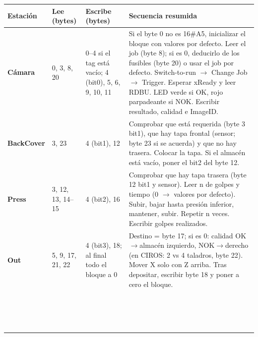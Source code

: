 \begin{tabularx}{\textwidth}{>{\bfseries}l p{2.6cm} p{3.6cm} X}
\toprule
Estación & Lee (bytes) & Escribe (bytes) & Secuencia resumida \\
\midrule
Cámara & 0, 3, 8, 20 & 0–4 si el tag está vacío; 4 (bit0), 5, 6, 9, 10, 11 & Si el byte 0 no es 16\#A5, inicializar el bloque con valores por defecto. Leer el job (byte 8); si es 0, deducirlo de los fusibles (byte 20) o usar el job por defecto. Switch-to-run $\rightarrow$ Change Job $\rightarrow$ Trigger. Esperar xReady y leer RDBU. LED verde si OK, rojo parpadeante si NOK. Escribir resultado, calidad e ImageID. \\
\midrule
BackCover & 3, 23 & 4 (bit1), 12 & Comprobar que está requerida (byte 3 bit1), que hay tapa frontal (sensor; byte 23 si se acuerda) y que no hay trasera. Colocar la tapa. Si el almacén está vacío, poner el bit2 del byte 12. \\
\midrule
Press & 3, 12, 13, 14–15 & 4 (bit2), 16 & Comprobar que hay tapa trasera (byte 12 bit1 y sensor). Leer n\textordmasculine{} de golpes y tiempo (0 $\rightarrow$ valores por defecto). Subir, bajar hasta presión inferior, mantener, subir. Repetir n veces. Escribir golpes realizados. \\
\midrule
Out & 5, 9, 17, 21, 22 & 4 (bit3), 18; al final todo el bloque a 0 & Destino = byte 17; si es 0: calidad OK$\rightarrow$almacén izquierdo, NOK$\rightarrow$derecho (en CIROS: 2 vs 4 taladros, byte 22). Mover X solo con Z arriba. Tras depositar, escribir byte 18 y poner a cero el bloque. \\
\midrule
 &  &  &  \\
\midrule
 &  &  &  \\
\midrule
 &  &  &  \\
\midrule
 &  &  &  \\
\midrule
 &  &  &  \\
\midrule
 &  &  &  \\
\midrule
 &  &  &  \\
\midrule
 &  &  &  \\
\midrule
 &  &  &  \\
\midrule
 &  &  &  \\
\midrule
 &  &  &  \\
\midrule
 &  &  &  \\
\midrule
 &  &  &  \\
\midrule
 &  &  &  \\
\midrule
 &  &  &  \\
\midrule
 &  &  &  \\

\end{tabularx}
